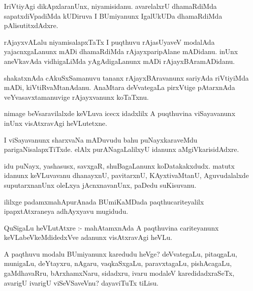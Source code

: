 \documentclass{article}
\begin{document}
\begin{mn}
IriVtiyAgi dikApxlaranUnx, niyamisidanu.  avarelalxrU dhamaRdiMda sapatxdiVpadiMda 
kUDiruva I BUmiyanunx IgalUkUDa dhamaRdiMda pAlisutitxdAdxre.
\end{mn}

\begin{mn}
rAjayxvALalu niyamisalapxTaTx I puqthuvu rAjasUyaveV modalAda yajacnxgaLanunx 
mADi dhamaRdiMda rAjayxparipAlane mADidanu. inUnx aneVkavAda vidhigaLiMda 
yAgAdigaLanunx mADi rAjayxBAramADidanu.
\end{mn}

\begin{mn}
shakatxnAda cAkuSxSamanuvu tananx rAjayxBAravanunx sariyAda riVtiyiMda mADi, 
kiVtiRvaMtanAdanu.  AnaMtara  deVvategaLa pirxVtige pAtarxnAda 
veYvasavxtamanuvige rAjayxvanunx koTaTxnu.
\end{mn}

\begin{mn}
nimage beVsaravilalxde keVLuva icecx idadxlilx A puqthuvina viSayavanunx 
inUnx visAtxravAgi heVLutetxne.
\end{mn}

\begin{mn}
I viSayavanunx sharxvaNa mADuvudu bahu puNayxkaraveMdu parigaNisalapxTiTxde. 
elAlx purANagaLalilxyU idanunx aMgiVkarisidAdxre.
\end{mn}

\begin{mn}
idu puNayx, yashasusx, savxgaR, shuBagaLanunx koDatakakxdudx.  matutx 
idanunx keVLuvavanu dhanayxnU, pavitarxnU, KAyxtivaMtanU, Aguvudalalxde 
suputarxnanUnx oleLxya jAcnxnavanUnx, paDedu suKisuvanu.
\end{mn}

\begin{mn}
ililxge padamxmahApurAnada BUmiKaMDada paqthucariteyalilx ipapxtAtxraneya adhAyxyavu mugidudu.
\end{mn}




\begin{mn}
QuSigaLu heVLutAtxre :- mahAtamxnAda A paqthuvina cariteyanunx keVLabeVkeMdidedxVve 
adanunx visAtxravAgi heVLu.
\end{mn}

\begin{mn}
A paqthuvu modalu BUmiyanunx karedudu  heVge?  deVvategaLu, pitaqgaLu, 
munigaLu, deYtayxru, nAgaru, vaqkaSxgaLu, paravxtagaLu, pishAcagaLu, 
gaMdhavaRru, bArxhamxNaru, sidadxru, ivaru modaleV karedidadxraSeTx, 
avarigU ivarigU viSeVSaveVnu? dayaviTuTx tiLisu.
\end{mn}
\end{document}
